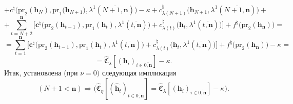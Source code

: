 \documentclass[12pt,twoside]{report}
\newcommand{\bfn}{\begin{equation}}
\newcommand{\efn}{\end{equation}}
\newcommand{\ov}{\overline}
\newcommand{\la}{\lambda}
\newcommand{\nn}{{\mathbf n}}
\begin{document}
{{$$$$
$$
+ c^\natural\bigl(\mathrm{pr}_2(\mathbf{h}_N),\mathrm{pr}_1\bigl(\mathbf{h}_{N+1}),
\la^1(\ov{N+1,\mathbf{n}})\bigl) - \kappa +
c_{\la(N+1)}^\natural\bigl(\mathbf{h}_{N+1},\la^1(\ov{N+1,\nn})\bigl)+ $$
$$
+ \sum\limits_{t=N+2}^\mathbf{n}\bigl[\mathbf{c}^\natural\bigl(\mathrm{pr}_2(\mathbf{h}_{t-1}),
\mathrm{pr}_1(\mathbf{h}_t),\la^1(\ov{t,\mathbf{n}})\bigl) + c_{\la(t)}^\natural\bigl(\mathbf{h}_t,
\la^1(\ov{t,\mathbf{n}})\bigl)\bigl] + f^\natural\bigl(\mathrm{pr}_2(\mathbf{h}_\mathbf{n})\bigl) =
$$
$$
= \sum\limits_{t=1}^\mathbf{n}\bigl[\mathbf{c}^\natural\bigl(\mathrm{pr}_2(\mathbf{h}_{t-1}),
\mathrm{pr}_1(\mathbf{h}_t),\la^1(\ov{t,\mathbf{n}})\bigl) +
c_{\la(t)}^\natural\bigl(\mathbf{h}_t,\la^1(\ov{t,\mathbf{n}})\bigl)\bigl] +
f^\natural\bigl(\mathrm{pr}_2(\mathbf{h}_\mathbf{n})\bigl) -\kappa =
$$
$$
= \widehat{\mathfrak{C}}_\la[(\mathbf{h}_i)_{i\in\ov{0,\mathbf{n}}}] - \kappa.
$$
Итак, установлена (при $\nu =0)$ следующая импликация
\bfn\label{4.5.49}
(N+1 < \mathbf{n}) \Longrightarrow \bigl(\widehat{\mathfrak{C}}_\eta[(\hat{\mathbf{h}}_t)_{t\in \ov{0,\mathbf{n}}}] =
\widehat{\mathfrak{C}}_\la[(\mathbf{h}_i)_{i\in \ov{0,\mathbf{n}}}] - \kappa\bigl).
\efn

}}
\end{document}
